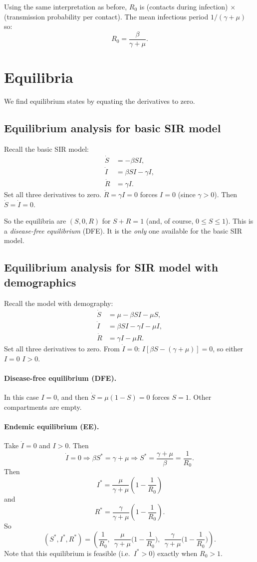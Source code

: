 Using the same interpretation as before, $R_0$ is (contacts during
infection) $\times$ (transmission probability per contact). The mean
infectious period $1/(\gamma+\mu)$ so:
\[
R_0 = \frac{\beta}{\gamma + \mu}.
\]

\section{Equilibria}
We find equilibrium states by equating the derivatives to zero.

\subsection{Equilibrium analysis for basic SIR model}

Recall the basic SIR model:
\begin{align*}
\dot S &= -\beta S I, \\
\dot I &= \beta S I - \gamma I, \\
\dot R &= \gamma I.
\end{align*}
Set all three derivatives to zero. $\dot R = \gamma I = 0$ forces
$I=0$ (since $\gamma>0$). Then  $\dot S = \dot{I} = 0$.

So the equilibria are $(S,0,R)$ for $S+R=1$ (and, of course, $0\le
S\le 1$). This is a \emph{disease-free equilibrium} (DFE). It is the
\emph{only} one available for the basic SIR model.

\subsection{Equilibrium analysis for SIR model with demographics}

Recall the model with demography:
\begin{align*}
\dot S &= \mu - \beta S I - \mu S, \\
\dot I &= \beta S I - \gamma I - \mu I, \\
\dot R &= \gamma I - \mu R.
\end{align*}
Set all three derivatives to zero. From $\dot I=0$:
$I[\beta S-(\gamma+\mu)]=0$, so either $I=0$ $I>0$.

\paragraph{Disease-free equilibrium (DFE).} In this case $I=0$, and then $\dot S=\mu(1-S)=0$
forces $S=1$. Other compartments are empty.

\paragraph{Endemic equilibrium (EE).} Take $\dot I=0$ and $I > 0$. Then
\[
\dot{I} = 0 \Rightarrow \beta S^* = \gamma + \mu \Rightarrow S^* =
\frac{\gamma +\mu}{\beta} = \frac{1}{R_0}.
\]
Then
\[
I^* = \frac{\mu}{\gamma+\mu}\left(1-\frac{1}{R_0}\right)
\]
and
\[
R^* = \frac{\gamma}{\gamma+\mu}\left(1-\frac{1}{R_0}\right).
\]
So
\[
(S^*,I^*,R^*) = \left(\frac{1}{R_0},\ \ \frac{\mu}{\gamma+\mu}\Big(1-\frac{1}{R_0}\Big),\ \ \frac{\gamma}{\gamma+\mu}\Big(1-\frac{1}{R_0}\Big)\right).
\]
Note that this equilibrium is feasible (i.e.\ $I^*>0$) exactly when
$R_0>1$.

